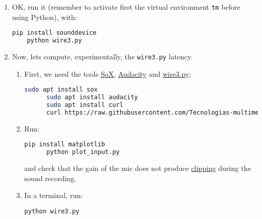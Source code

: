 \begin{enumerate}
\item OK, run it (remember to activate first the virtual environment
  \texttt{tm} before using Python), with:

  \begin{lstlisting}[language=Bash]
    pip install sounddevice
    python wire3.py
  \end{lstlisting}


\item Now, lets compute, experimentally, the \texttt{wire3.py}
  latency.

  \begin{enumerate} \item First, we need the
  tools \href{http://sox.sourceforge.net/}{SoX}, \href{https://www.audacityteam.org/}{Audacity}
  and \href{https://raw.githubusercontent.com/Tecnologias-multimedia/intercom/master/test/sounddevice/wire3.py}{wire3.py}:
  
    \begin{lstlisting}[language=Bash]
      sudo apt install sox
      sudo apt install audacity
      sudo apt install curl
      curl https://raw.githubusercontent.com/Tecnologias-multimedia/intercom/master/test/sounddevice/plot_input.py > plot_input.py
    \end{lstlisting}

  \item Run:

    \begin{lstlisting}[language=Bash]
      pip install matplotlib
      python plot_input.py
    \end{lstlisting}

    and check that the gain of the mic does not
    produce \href{https://en.wikipedia.org/wiki/Clipping_(audio)}{clipping}
    during the sound recording.

  \item \label{start_point} In a terminal, run:

    \begin{lstlisting}[language=Bash]
      python wire3.py
    \end{lstlisting}


\end{enumerate}
\end{enumerate}
